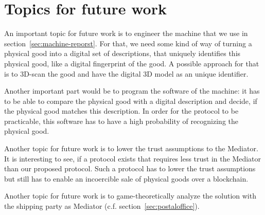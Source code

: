 \documentclass{cacthesis}
\begin{document}
\section{Topics for future work}

An important topic for future work is to engineer the machine that we use in section~\ref{sec:machine-reporst}. For that, we need some kind of way of turning a physical good into a digital set of descriptions, that uniquely identifies this physical good, like a digital fingerprint of the good. A possible approach for that is to 3D-scan the good and have the digital 3D model as an unique identifier.\newline

Another important part would be to program the software of the machine: it has to be able to compare the physical good with a digital description and decide, if the physical good matches this description. In order for the protocol to be practicable, this software has to have a high probability of recognizing the physical good.\newline

Another topic for future work is to lower the trust assumptions to the Mediator. It is interesting to see, if a protocol exists that requires less trust in the Mediator than our proposed protocol. Such a protocol has to lower the trust assumptions but still has to enable an incoercible sale of physical goods over a blockchain.\newline

Another topic for future work is to game-theoretically analyze the solution with the shipping party as Mediator (c.f. section~\ref{sec:postaloffice}). 




	
	
	\printbibliography
	
	\appendix
\end{document}
